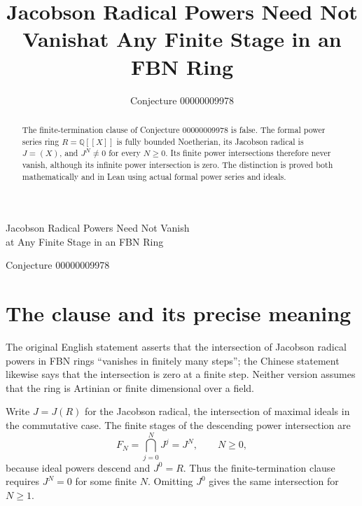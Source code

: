 \documentclass[11pt]{article}
\title{Jacobson Radical Powers Need Not Vanish\newline at Any Finite Stage in an FBN Ring}
\author{Conjecture 00000009978}
\date{}
\newcommand{\Q}{\mathbb Q}
\begin{document}
\begin{center}
{\Large Jacobson Radical Powers Need Not Vanish\\
at Any Finite Stage in an FBN Ring}\par\medskip
Conjecture 00000009978
\end{center}
\begin{abstract}
The finite-termination clause of Conjecture 00000009978 is false. The formal power series ring $R=\Q[[X]]$ is fully bounded Noetherian, its Jacobson radical is $J=(X)$, and $J^N\ne0$ for every $N\geq0$. Its finite power intersections therefore never vanish, although its infinite power intersection is zero. The distinction is proved both mathematically and in Lean using actual formal power series and ideals.
\end{abstract}

\section*{The clause and its precise meaning}
The original English statement asserts that the intersection of Jacobson radical powers in FBN rings ``vanishes in finitely many steps''; the Chinese statement likewise says that the intersection is zero at a finite step. Neither version assumes that the ring is Artinian or finite dimensional over a field.

Write $J=J(R)$ for the Jacobson radical, the intersection of maximal ideals in the commutative case. The finite stages of the descending power intersection are
\[
 F_N=\bigcap_{j=0}^{N}J^j=J^N,\qquad N\geq0,
\]
because ideal powers descend and $J^0=R$. Thus the finite-termination clause requires $J^N=0$ for some finite $N$. Omitting $J^0$ gives the same intersection for $N\geq1$.
\end{document}
